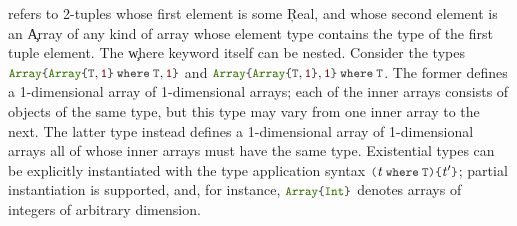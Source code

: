 %
refers to 2-tuples whose first element is some \c{Real}, and whose second
element is an \c{Array} of any kind of array whose element type contains
the type of the first tuple element.  The \c{where} keyword itself can be
nested. Consider the types
\(  \texttt{\small\color{jlbuiltin} Array}   \texttt{\small\color{jlkeyword} \{}   \texttt{\small\color{jlbuiltin} Array}   \texttt{\small\color{jlkeyword} \{}  \texttt{\small\color{jlbase}T}  \ottsym{,}   \texttt{\small\color{jlstring} 1}   \texttt{\small\color{jlkeyword} \}\kern0pt}  \:  \texttt{\small\color{jlbase}\textbf{where}\kern0pt} \:  \texttt{\small\color{jlbase}T}   \ottsym{,}   \texttt{\small\color{jlstring} 1}   \texttt{\small\color{jlkeyword} \}\kern0pt} \) and
\(  \texttt{\small\color{jlbuiltin} Array}   \texttt{\small\color{jlkeyword} \{}   \texttt{\small\color{jlbuiltin} Array}   \texttt{\small\color{jlkeyword} \{}  \texttt{\small\color{jlbase}T}  \ottsym{,}   \texttt{\small\color{jlstring} 1}   \texttt{\small\color{jlkeyword} \}\kern0pt}  \ottsym{,}   \texttt{\small\color{jlstring} 1}   \texttt{\small\color{jlkeyword} \}\kern0pt} \:  \texttt{\small\color{jlbase}\textbf{where}\kern0pt} \:  \texttt{\small\color{jlbase}T} \).
The former defines a 1-dimensional array of 1-dimensional arrays; each of
the inner arrays consists of objects of the same type, but this type may
vary from one inner array to the next. The latter type instead defines
a 1-dimensional array of 1-dimensional arrays all of whose inner arrays must
have the same type.  Existential types can be explicitly instantiated
with the type application syntax \(\texttt{\small\color{jlkeyword} (}   \ottnt{t} \:  \texttt{\small\color{jlbase}\textbf{where}\kern0pt} \:  \texttt{\small\color{jlbase}T}   \texttt{\small\color{jlkeyword} )}  \texttt{\small\color{jlkeyword} \{}  \ottnt{t'}  \texttt{\small\color{jlkeyword} \}\kern0pt}\); partial
instantiation is supported, and, for instance, \( \texttt{\small\color{jlbuiltin} Array}   \texttt{\small\color{jlkeyword} \{}   \texttt{\small\color{jlbuiltin}\color{jlbuiltin} Int}   \texttt{\small\color{jlkeyword} \}\kern0pt}\) denotes
arrays of
integers of arbitrary dimension.


